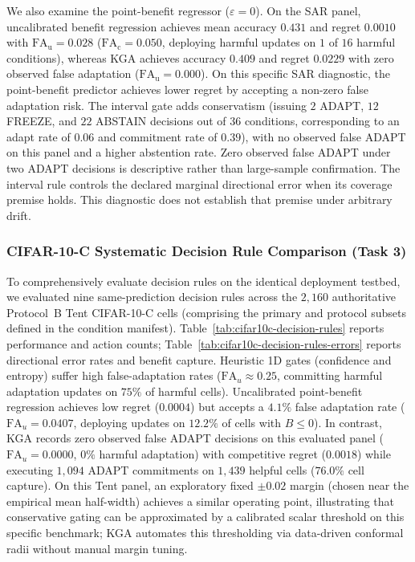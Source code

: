 We also examine the point-benefit regressor ($\varepsilon=0$). On the SAR panel, uncalibrated benefit regression achieves
mean accuracy $0.431$ and regret $0.0010$ with $\mathrm{FA}_{\mathrm u} = 0.028$ ($\mathrm{FA}_{\mathrm c} = 0.050$, deploying harmful updates on $1$ of $16$ harmful conditions),
whereas KGA achieves accuracy $0.409$ and regret $0.0229$ with zero observed false adaptation ($\mathrm{FA}_{\mathrm u} = 0.000$).
On this specific SAR diagnostic, the point-benefit predictor achieves lower regret by accepting a non-zero false adaptation risk.
The interval gate adds conservatism (issuing $2$ ADAPT, $12$ FREEZE, and $22$ ABSTAIN decisions out of $36$ conditions,
corresponding to an adapt rate of $0.06$ and commitment rate of $0.39$), with no observed false ADAPT on this panel and a higher abstention rate.
Zero observed false ADAPT under two ADAPT decisions is descriptive rather than large-sample confirmation. The interval rule controls the declared marginal
directional error when its coverage premise holds. This diagnostic does not establish that premise under arbitrary drift.

\subsubsection{CIFAR-10-C Systematic Decision Rule Comparison (Task 3)}
\label{app:cifar10c-decision-rules}

To comprehensively evaluate decision rules on the identical deployment testbed, we evaluated nine same-prediction decision rules across the $2{,}160$ authoritative Protocol~B Tent CIFAR-10-C cells (comprising the primary and protocol subsets defined in the condition manifest). Table~\ref{tab:cifar10c-decision-rules} reports performance and action counts; Table~\ref{tab:cifar10c-decision-rules-errors} reports directional error rates and benefit capture. Heuristic 1D gates (confidence and entropy) suffer high false-adaptation rates ($\mathrm{FA}_u \approx 0.25$, committing harmful adaptation updates on $75\%$ of harmful cells). Uncalibrated point-benefit regression achieves low regret ($0.0004$) but accepts a $4.1\%$ false adaptation rate ($\mathrm{FA}_u = 0.0407$, deploying updates on $12.2\%$ of cells with $B \le 0$). In contrast, KGA records zero observed false ADAPT decisions on this evaluated panel ($\mathrm{FA}_u = 0.0000$, $0\%$ harmful adaptation) with competitive regret ($0.0018$) while executing $1{,}094$ ADAPT commitments on $1{,}439$ helpful cells ($76.0\%$ cell capture). On this Tent panel, an exploratory fixed $\pm 0.02$ margin (chosen near the empirical mean half-width) achieves a similar operating point, illustrating that conservative gating can be approximated by a calibrated scalar threshold on this specific benchmark; KGA automates this thresholding via data-driven conformal radii without manual margin tuning.

